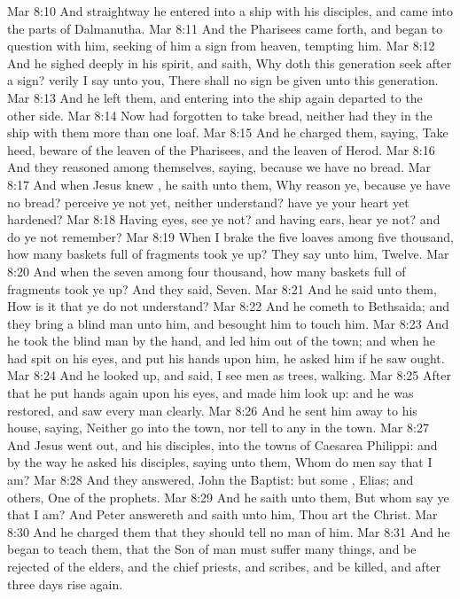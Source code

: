 \vs Mar 8:10 And straightway he entered into a ship with his disciples, and came into the parts of Dalmanutha.
\vs Mar 8:11 And the Pharisees came forth, and began to question with him, seeking of him a sign from heaven, tempting him.
\vs Mar 8:12 And he sighed deeply in his spirit, and saith, Why doth this generation seek after a sign? verily I say unto you, There shall no sign be given unto this generation.
\vs Mar 8:13 And he left them, and entering into the ship again departed to the other side.
\vs Mar 8:14 Now  had forgotten to take bread, neither had they in the ship with them more than one loaf.
\vs Mar 8:15 And he charged them, saying, Take heed, beware of the leaven of the Pharisees, and  the leaven of Herod.
\vs Mar 8:16 And they reasoned among themselves, saying,  because we have no bread.
\vs Mar 8:17 And when Jesus knew , he saith unto them, Why reason ye, because ye have no bread? perceive ye not yet, neither understand? have ye your heart yet hardened?
\vs Mar 8:18 Having eyes, see ye not? and having ears, hear ye not? and do ye not remember?
\vs Mar 8:19 When I brake the five loaves among five thousand, how many baskets full of fragments took ye up? They say unto him, Twelve.
\vs Mar 8:20 And when the seven among four thousand, how many baskets full of fragments took ye up? And they said, Seven.
\vs Mar 8:21 And he said unto them, How is it that ye do not understand?
\vs Mar 8:22 And he cometh to Bethsaida; and they bring a blind man unto him, and besought him to touch him.
\vs Mar 8:23 And he took the blind man by the hand, and led him out of the town; and when he had spit on his eyes, and put his hands upon him, he asked him if he saw ought.
\vs Mar 8:24 And he looked up, and said, I see men as trees, walking.
\vs Mar 8:25 After that he put  hands again upon his eyes, and made him look up: and he was restored, and saw every man clearly.
\vs Mar 8:26 And he sent him away to his house, saying, Neither go into the town, nor tell  to any in the town.
\vs Mar 8:27 And Jesus went out, and his disciples, into the towns of Caesarea Philippi: and by the way he asked his disciples, saying unto them, Whom do men say that I am?
\vs Mar 8:28 And they answered, John the Baptist: but some , Elias; and others, One of the prophets.
\vs Mar 8:29 And he saith unto them, But whom say ye that I am? And Peter answereth and saith unto him, Thou art the Christ.
\vs Mar 8:30 And he charged them that they should tell no man of him.
\vs Mar 8:31 And he began to teach them, that the Son of man must suffer many things, and be rejected of the elders, and  the chief priests, and scribes, and be killed, and after three days rise again.
